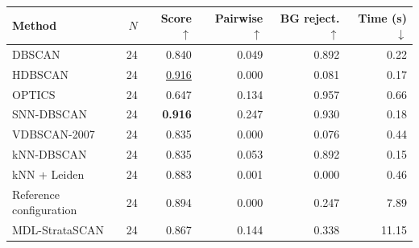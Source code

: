 \begin{tabular}{lrrrrr}
\toprule
Method & $N$ & Score $\uparrow$ & Pairwise $\uparrow$ & BG reject. $\uparrow$ & Time (s) $\downarrow$ \\
\midrule
DBSCAN & 24 & 0.840 & 0.049 & 0.892 & 0.22 \\
HDBSCAN & 24 & \underline{0.916} & 0.000 & 0.081 & 0.17 \\
OPTICS & 24 & 0.647 & 0.134 & 0.957 & 0.66 \\
SNN-DBSCAN & 24 & \textbf{0.916} & 0.247 & 0.930 & 0.18 \\
VDBSCAN-2007 & 24 & 0.835 & 0.000 & 0.076 & 0.44 \\
kNN-DBSCAN & 24 & 0.835 & 0.053 & 0.892 & 0.15 \\
kNN + Leiden & 24 & 0.883 & 0.001 & 0.000 & 0.46 \\
Reference configuration & 24 & 0.894 & 0.000 & 0.247 & 7.89 \\
MDL-StrataSCAN & 24 & 0.867 & 0.144 & 0.338 & 11.15 \\
\bottomrule
\end{tabular}
